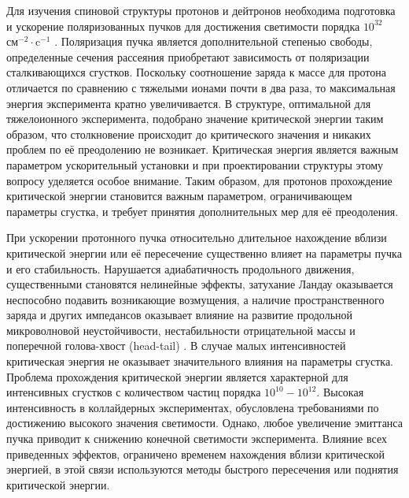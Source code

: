 \par	Для изучения спиновой структуры протонов и дейтронов необходима подготовка и ускорение поляризованных пучков для достижения светимости порядка $10^{32}$ $\text{см}^{-2}\cdot\text{c}^{-1}$ \cite{RHIC_luminosity}. Поляризация пучка является дополнительной степенью свободы, определенные сечения рассеяния приобретают зависимость от поляризации сталкивающихся сгустков. Поскольку соотношение заряда к массе для протона отличается по сравнению с тяжелыми ионами почти в два раза, то максимальная энергия эксперимента кратно увеличивается. В структуре, оптимальной для тяжелоионного эксперимента, подобрано значение критической энергии таким образом, что столкновение происходит до критического значения и никаких проблем по её преодолению не возникает. Критическая энергия является важным параметром ускорительный установки и при проектировании структуры этому вопросу уделяется особое внимание. Таким образом, для протонов прохождение критической энергии становится важным параметром, ограничивающем параметры сгустка, и требует принятия дополнительных мер для её преодоления.

\par	При ускорении протонного пучка относительно длительное нахождение вблизи критической энергии или её пересечение существенно влияет на параметры пучка и его стабильность. Нарушается адиабатичность продольного движения, существенными становятся нелинейные эффекты, затухание Ландау оказывается неспособно подавить возникающие возмущения, а наличие пространственного заряда и других импедансов оказывает влияние на развитие продольной микроволновой неустойчивости, нестабильности отрицательной массы и поперечной голова-хвост (head-tail) \cite{ng, lee}. В случае малых интенсивностей критическая энергия не оказывает значительного влияния на параметры сгустка. Проблема прохождения критической энергии является характерной для интенсивных сгустков с количеством частиц порядка $10^{10}-10^{12}$. Высокая интенсивность в коллайдерных экспериментах, обусловлена требованиями по достижению высокого значения светимости. Однако, любое увеличение эмиттанса пучка приводит к снижению конечной светимости эксперимента. Влияние всех приведенных эффектов, ограничено временем нахождения вблизи критической энергией, в этой связи используются методы быстрого пересечения или поднятия критической энергии.

